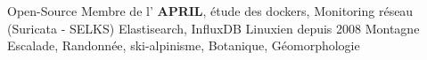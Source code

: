 

\begin{cvskills}

  \cvskill
  	{Open-Source}
  	{Membre de l' \textbf{APRIL}, étude des dockers, Monitoring réseau (Suricata - SELKS) Elastisearch, InfluxDB Linuxien depuis 2008 }
  \cvskill
    {Montagne}
    {Escalade, Randonnée, ski-alpinisme, Botanique, Géomorphologie}
 
\end{cvskills}
